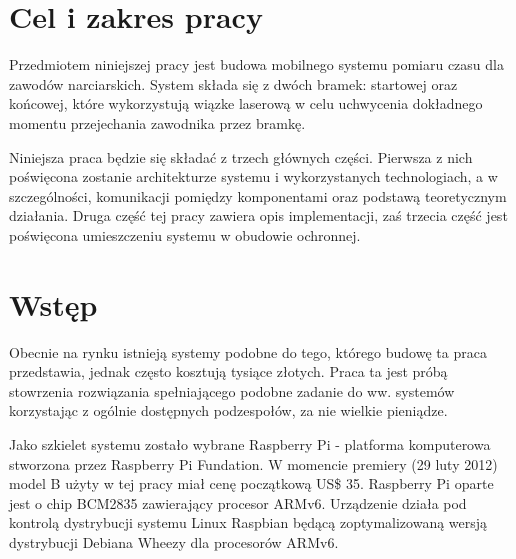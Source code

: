 \documentclass[11pt,a4paper, twoside]{article}
\begin{document}
 

\tableofcontents

\newpage
\cleardoublepage
\section{Cel i zakres pracy}
Przedmiotem niniejszej pracy jest budowa mobilnego systemu pomiaru czasu dla zawodów narciarskich. System składa się z dwóch bramek: startowej oraz końcowej, które wykorzystują wiązke laserową w celu uchwycenia dokładnego momentu przejechania zawodnika przez bramkę. 

Niniejsza praca będzie się składać z trzech głównych części. Pierwsza z nich poświęcona zostanie architekturze systemu i wykorzystanych technologiach, a w szczególności, komunikacji pomiędzy komponentami oraz podstawą teoretycznym działania. Druga część tej pracy zawiera opis implementacji, zaś trzecia część jest poświęcona umieszczeniu systemu w obudowie ochronnej.

\section{Wstęp}
Obecnie na rynku istnieją systemy podobne do tego, którego budowę ta praca przedstawia, jednak często kosztują tysiące złotych. Praca ta jest próbą stowrzenia rozwiązania spełniającego podobne zadanie do ww. systemów korzystając z ogólnie dostępnych podzespołów, za nie wielkie pieniądze.

Jako szkielet systemu zostało wybrane Raspberry Pi - platforma komputerowa stworzona przez Raspberry Pi Fundation. W momencie premiery (29 luty 2012) model B użyty w tej pracy miał cenę początkową US\$ 35. Raspberry Pi oparte jest o chip BCM2835 zawierający procesor ARMv6. Urządzenie działa pod kontrolą dystrybucji systemu Linux Raspbian będącą zoptymalizowaną wersją dystrybucji Debiana Wheezy dla procesorów ARMv6.
\end{document}
